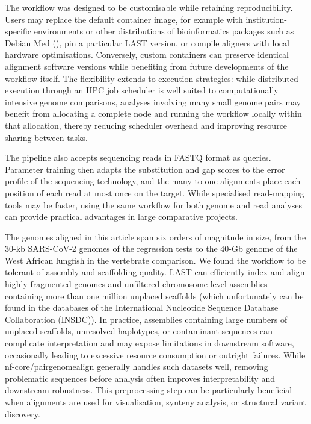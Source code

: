 \documentclass[PCJ,Unicode,screen]{cedram}
\begin{document}
The workflow was designed to be customisable while retaining reproducibility. Users may replace the default container image, for example with institution-specific environments or other distributions of bioinformatics packages such as Debian Med (\cite{Moeller_2010}), pin a particular LAST version, or compile aligners with local hardware optimisations. Conversely, custom containers can preserve identical alignment software versions while benefiting from future developments of the workflow itself. The flexibility extends to execution strategies: while distributed execution through an HPC job scheduler is well suited to computationally intensive genome comparisons, analyses involving many small genome pairs may benefit from allocating a complete node and running the workflow locally within that allocation, thereby reducing scheduler overhead and improving resource sharing between tasks.

The pipeline also accepts sequencing reads in FASTQ format as queries. Parameter training then adapts the substitution and gap scores to the error profile of the sequencing technology, and the many-to-one alignments place each position of each read at most once on the target. While specialised read-mapping tools may be faster, using the same workflow for both genome and read analyses can provide practical advantages in large comparative projects.

The genomes aligned in this article span six orders of magnitude in size, from the 30-kb SARS-CoV-2 genomes of the regression tests to the 40-Gb genome of the West African lungfish in the vertebrate comparison. We found the workflow to be tolerant of assembly and scaffolding quality. LAST can efficiently index and align highly fragmented genomes and unfiltered chromosome-level assemblies containing more than one million unplaced scaffolds (which unfortunately can be found in the databases of the International Nucleotide Sequence Database Collaboration (INSDC)). In practice, assemblies containing large numbers of unplaced scaffolds, unresolved haplotypes, or contaminant sequences can complicate interpretation and may expose limitations in downstream software, occasionally leading to excessive resource consumption or outright failures. While nf-core/pairgenomealign generally handles such datasets well, removing problematic sequences before analysis often improves interpretability and downstream robustness. This preprocessing step can be particularly beneficial when alignments are used for visualisation, synteny analysis, or structural variant discovery.
\end{document}
